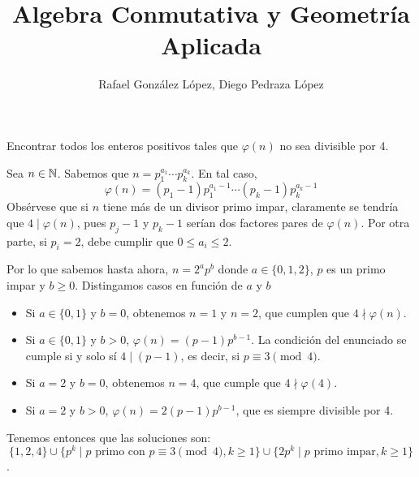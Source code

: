 \documentclass[twoside]{article}
\begin{document}
\title{Algebra Conmutativa y Geometría Aplicada}
\author{Rafael González López, Diego Pedraza López}
\maketitle

\begin{ejercicio}{1}
Encontrar todos los enteros positivos tales que $\varphi(n)$ no sea divisible por 4.
\begin{sol}
Sea $n\in \mathbb{N}$. Sabemos que $n=p_1^{a_1}\cdots p_k^{a_k}$. En tal caso, 
\[
\varphi(n) = (p_1-1)p_1^{a_1-1}\cdots(p_k-1)p_k^{a_k-1}
\]
Obsérvese que si $n$ tiene más de un divisor primo impar, claramente se tendría que $4\mid \varphi(n)$, pues $p_j -1$ y $p_k-1$ serían dos factores pares de $\varphi(n)$. Por otra parte, si $p_i=2$, debe cumplir que $0\leq a_i \leq 2$. 

Por lo que sabemos hasta ahora, $n = 2^a p^b$ donde $a\in\{0,1,2\}$, $p$ es un primo impar y $b\geq 0$. Distingamos casos en función de $a$ y $b$
\begin{itemize}
\item Si $a \in \{0,1\}$ y $b = 0$, obtenemos $n=1$ y $n=2$, que cumplen que $4 \nmid φ(n)$.
\item Si $a \in \{0,1\}$ y $b > 0$, $\varphi(n) = (p-1)p^{b-1}$. La condición del enunciado se cumple si y solo sí $4 \mid (p-1)$, es decir, si $p \equiv 3 \pmod 4$.
\item Si $a=2$ y $b = 0$, obtenemos $n=4$, que cumple que $4 \nmid φ(4)$.
\item Si $a=2$ y $b > 0$, $\varphi(n)=2(p-1)p^{b-1}$, que es siempre divisible por 4.
\end{itemize}
Tenemos entonces que las soluciones son:
\[ \{1,2,4\} \cup \{p^k \mid p\text{ primo con } p \equiv 3 \pmod 4, k≥1\} \cup \{2p^k \mid p\text{ primo impar}, k ≥ 1\} \].
\end{sol}
\end{ejercicio}

\newpage
\end{document}
